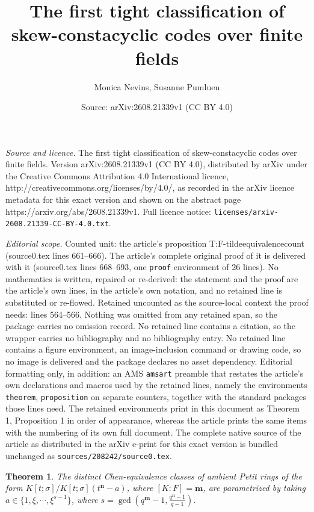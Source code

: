 \documentclass[10pt,a4paper]{amsart}
\title{The first tight classification of skew-constacyclic codes over finite fields}
\author{Monica Nevins, Susanne Pumluen}
\date{Source: arXiv:2608.21339v1 (CC BY 4.0)}
\newtheorem{theorem}{Theorem}
\newcommand{\de}{{\mathbf{n}}}  %
\newcommand{\os}{{\mathbf{m}}}  %
\begin{document}
\maketitle

\noindent\emph{Source and licence.} The first tight classification of skew-constacyclic codes over finite fields. Version arXiv:2608.21339v1 (CC BY 4.0), distributed by arXiv under the Creative Commons Attribution 4.0 International licence, http://creativecommons.org/licenses/by/4.0/, as recorded in the arXiv licence metadata for this exact version and shown on the abstract page https://arxiv.org/abs/2608.21339v1. Full licence notice: \texttt{licenses/arxiv-2608.21339-CC-BY-4.0.txt}.\par\smallskip

\noindent\textit{Editorial scope.} Counted unit: the article's proposition T:F-tildeequivalencecount (source0.tex lines 661--666). The article's complete original proof of it is delivered with it (source0.tex lines 668--693, one \texttt{proof} environment of 26 lines). No mathematics is written, repaired or re-derived: the statement and the proof are the article's own lines, in the article's own notation, and no retained line is substituted or re-flowed.  Retained uncounted as the source-local context the proof needs: lines 564--566.  Nothing was omitted from any retained span, so the package carries no omission record.  No retained line contains a citation, so the wrapper carries no bibliography and no bibliography entry.  No retained line contains a figure environment, an image-inclusion command or drawing code, so no image is delivered and the package declares no asset dependency.  Editorial formatting only, in addition: an AMS \texttt{amsart} preamble that restates the article's own declarations and macros used by the retained lines, namely the environments \texttt{theorem}, \texttt{proposition} on separate counters, together with the standard packages those lines need.  The retained environments print in this document as Theorem 1, Proposition 1 in order of appearance, whereas the article prints the same items with the numbering of its own full document.  The complete native source of the article as distributed in the arXiv e-print for this exact version is bundled unchanged as \texttt{sources/208242/source0.tex}.
\begin{theorem}\label{L:Chenclassesfinitefield}
    The distinct Chen-equivalence classes of  ambient Petit rings of the form  $K[t;\sigma]/K[t;\sigma](t^\de-a)$, where $[K:F]=\os$, are parametrized by taking $a\in \{1, \xi, \cdots, \xi^{s-1}\}$, where $s = \gcd\left(q^\os-1, \frac{q^\de-1}{q-1}\right).$
    \end{theorem}
\end{document}
